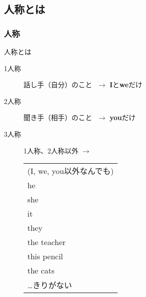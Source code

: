 \documentclass[aspectratio=169,xcolor={dvipsnames,table}]{beamer}
\begin{document}
\subsection{人称とは}
\begin{frame}[plain,label=ninsyo]\frametitle{人称}

\begin{alertblock}{人称とは}
\begin{description}
\item[1人称] 話し手（自分）のこと\pause{}\,\,{} $\longrightarrow$ \textbf{I}と\textbf{we}だけ\pause
\item[2人称] 聞き手（相手）のこと\pause{}\,\,{} $\longrightarrow$ \textbf{you}だけ\pause
\item[3人称] 1人称、2人称以外\pause{}\hspace{15pt} $\longrightarrow$%
 \begin{tabular}[t]{@{\,\,}l}
(I, we, you以外なんでも)\\\pause
he\\\pause
she\\\pause
it\\\pause
they\\\pause
the teacher\\\pause
this pencil\\\pause
the cats\\\pause
\ldots\hfill{}きりがない
 \end{tabular}
\end{description}
\end{alertblock}
\end{frame}
\end{document}
